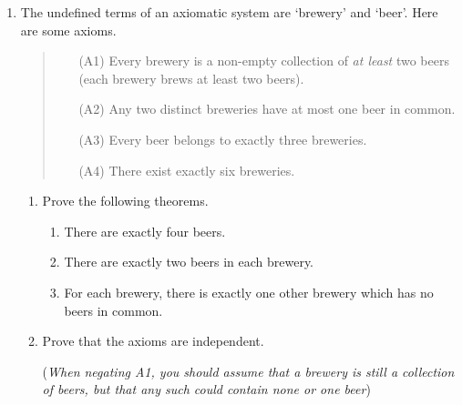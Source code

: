 \begin{exercises}{}{}
\begin{enumerate}
		
		\item The undefined terms of an axiomatic system are `brewery' and `beer'. Here are some axioms.
	  \begin{quote}
		\begin{itemize}
	  	\item[(A1)] Every brewery is a non-empty collection of \emph{at least} two beers (each brewery brews at least two beers).
	  	\item[(A2)] Any two distinct breweries have at most one beer in common.
	  	\item[(A3)] Every beer belongs to exactly three breweries.
	  	\item[(A4)] There exist exactly six breweries.
		\end{itemize}
	  \end{quote}
	  \begin{enumerate}
	    \item Prove the following theorems.
	    \begin{enumerate}
	      \item There are exactly four beers.
	      \item There are exactly two beers in each brewery.
	      \item For each brewery, there is exactly one other brewery which has no beers in common.
	  	\end{enumerate}
	  	\item Prove that the axioms are independent.\par
	  	(\emph{When negating A1, you should assume that a brewery is still a collection of beers, but that any such could contain none or one beer})
	  \end{enumerate}
	  
	\end{enumerate}
\end{exercises}
